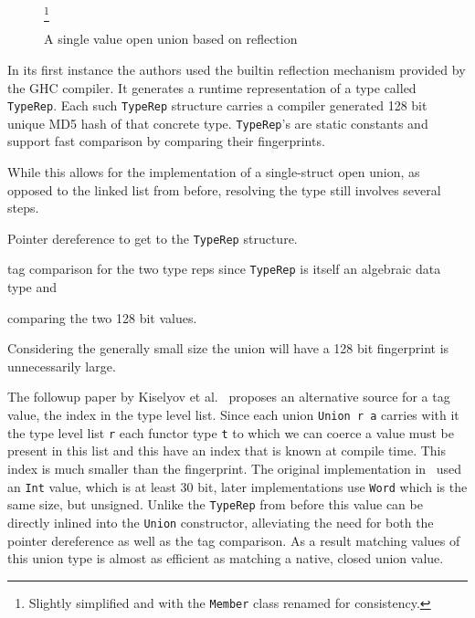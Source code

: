 \begin{figure}
  
  \caption{A single value open union based on reflection}\footnote{Slightly
      simplified and with the \texttt{Member} class renamed for consistency.}
  \label{fig:union-type}
\end{figure}

In its first instance the authors used the builtin reflection
mechanism provided by the GHC compiler\cite{ghc}. It generates a runtime
representation of a type called \texttt{TypeRep}. Each such \texttt{TypeRep}
structure carries a compiler generated 128 bit unique MD5 hash of that concrete
type. \texttt{TypeRep}'s are static constants and support fast comparison by
comparing their fingerprints.

While this allows for the implementation of a single-struct open union, as
opposed to the linked list from before, resolving the type still involves
several steps.
\begin{enumerate*}
\item Pointer dereference to get to the \texttt{TypeRep} structure.
\item tag comparison for the two type reps since \texttt{TypeRep} is itself an
  algebraic data type and
\item comparing the two 128 bit values.
\end{enumerate*}
Considering the generally small size the union will have a 128 bit fingerprint
is unnecessarily large.

The followup paper by Kiselyov et al.~\cite{freer} proposes an alternative
source for a tag value, the index in the type level list. Since each union
\texttt{Union r a} carries with it the type level list \texttt{r} each functor
type \texttt{t} to which we can coerce a value must be present in this list and
this have an index that is known at compile time. This index is much smaller
than the fingerprint. The original implementation in~\cite{freer} used an
\texttt{Int} value, which is at least 30 bit, later implementations use
\texttt{Word} which is the same size, but unsigned. Unlike the \texttt{TypeRep}
from before this value can be directly inlined into the \texttt{Union}
constructor, alleviating the need for both the pointer dereference as well as
the tag comparison. As a result matching values of this union type is almost as
efficient as matching a native, closed union value.
